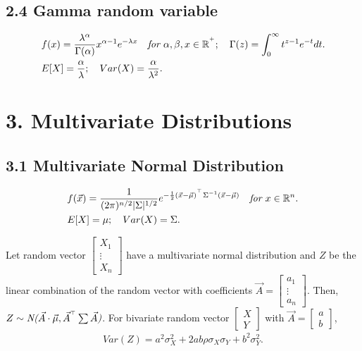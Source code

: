 \documentclass{article}
\begin{document}
\subsection*{2.4 Gamma random variable}
\begin{align}
    & f(x) = \frac{\lambda^{\alpha}}{\Gamma(\alpha)} x^{\alpha-1} e^{-\lambda x} \quad \emph{for $\alpha, \beta, x\in \mathbb{R}^{^+}$}; \quad \Gamma(z) = \int_0^\infty t^{z-1}e^{-t}dt. \nonumber \\
    & E[X] = \frac{\alpha}{\lambda}; \quad Var(X) = \frac{\alpha}{\lambda^2}. \nonumber
\end{align}

\newpage
\section*{3. Multivariate Distributions}
\subsection*{3.1 Multivariate Normal Distribution}
\begin{align}
    & f(\vec{x}) = \frac{1}{(2\pi)^{n/2}|\Sigma|^{1/2}} e^{-\frac{1}{2}(\vec{x}-\vec{\mu})^{^\top}\Sigma^{-1}(\vec{x}-\vec{\mu})} \quad \emph{for $x\in \mathbb{R}^n$}. \nonumber \\
    & E[X] = \mu; \quad Var(X) = \Sigma. \nonumber
\end{align}

Let random vector $\begin{bmatrix} X_1 \\ \vdots \\ X_n \end{bmatrix}$ have a multivariate normal distribution and $Z$ be the linear combination of the random vector with coefficients $\vec{A} = \begin{bmatrix}
    a_1 \\ 
    \vdots \\
    a_n
\end{bmatrix}$.
Then, $Z\sim \emph{N($\vec{A}\cdot \vec{\mu},\vec{A}^{^\top}\sum\vec{A}$)}$.
For bivariate random vector $\begin{bmatrix}
    X \\ Y
\end{bmatrix}$ with $\vec{A} = \begin{bmatrix}
    a \\ b
\end{bmatrix}$,
\begin{align}
    Var(Z) = a^2\sigma_X^2+2ab\rho\sigma_X\sigma_Y+b^2\sigma_Y^2. \nonumber
\end{align}
\end{document}
